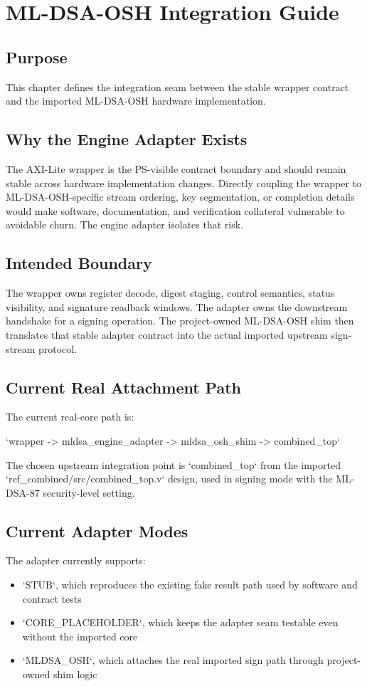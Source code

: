 \chapter{ML-DSA-OSH Integration Guide}

\section*{Purpose}
This chapter defines the integration seam between the stable wrapper contract and the imported ML-DSA-OSH hardware implementation.

\section{Why the Engine Adapter Exists}
The AXI-Lite wrapper is the PS-visible contract boundary and should remain stable across hardware implementation changes. Directly coupling the wrapper to ML-DSA-OSH-specific stream ordering, key segmentation, or completion details would make software, documentation, and verification collateral vulnerable to avoidable churn. The engine adapter isolates that risk.

\section{Intended Boundary}
The wrapper owns register decode, digest staging, control semantics, status visibility, and signature readback windows. The adapter owns the downstream handshake for a signing operation. The project-owned ML-DSA-OSH shim then translates that stable adapter contract into the actual imported upstream sign-stream protocol.

\section{Current Real Attachment Path}
The current real-core path is:
\begin{center}
  `wrapper -> mldsa\_engine\_adapter -> mldsa\_osh\_shim -> combined\_top`
\end{center}

The chosen upstream integration point is `combined\_top` from the imported `ref\_combined/src/combined\_top.v` design, used in signing mode with the ML-DSA-87 security-level setting.

\section{Current Adapter Modes}
The adapter currently supports:
\begin{itemize}[leftmargin=*]
  \item `STUB`, which reproduces the existing fake result path used by software and contract tests
  \item `CORE\_PLACEHOLDER`, which keeps the adapter seam testable even without the imported core
  \item `MLDSA\_OSH`, which attaches the real imported sign path through project-owned shim logic
\end{itemize}

